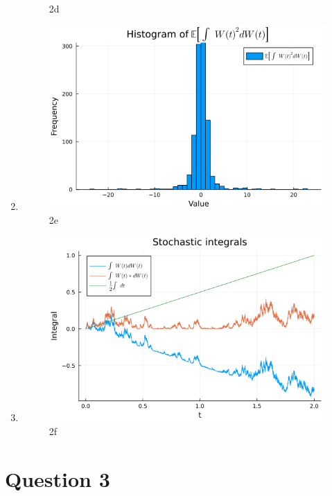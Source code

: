 \documentclass{article}
\begin{document}
\begin{enumerate}
\begin{figure}[H]
            \caption{2d}
            \label{fig:2d}
        \end{figure}
    \item
        \begin{figure}[H]
            \centering
            \includegraphics[scale=0.6]{imgs/2e.png}
            \caption{2e}
            \label{fig:2e}
        \end{figure}

    \item 
        \begin{figure}[H]
            \centering
            \includegraphics[scale=0.6]{imgs/2f.png}
            \caption{2f}
            \label{fig:2f}
        \end{figure}
\end{enumerate}

\section*{Question 3}
\end{document}
